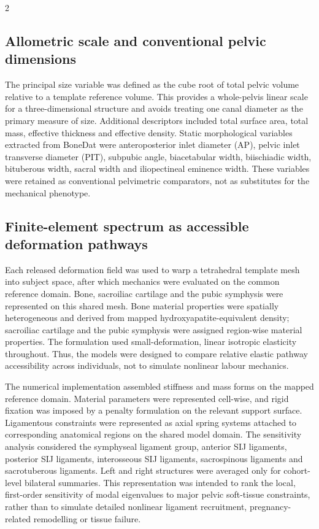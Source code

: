 \documentclass[openacc]{rsproca_new}
\begin{document}
\begin{multicols}{2}
\subsection{Allometric scale and conventional pelvic dimensions}

The principal size variable was defined as the cube root of total pelvic volume relative to a template reference volume. This provides a whole-pelvis linear scale for a three-dimensional structure and avoids treating one canal diameter as the primary measure of size. Additional descriptors included total surface area, total mass, effective thickness and effective density. Static morphological variables extracted from BoneDat were anteroposterior inlet diameter (AP), pelvic inlet transverse diameter (PIT), subpubic angle, biacetabular width, biischiadic width, bituberous width, sacral width and iliopectineal eminence width. These variables were retained as conventional pelvimetric comparators, not as substitutes for the mechanical phenotype.

\subsection{Finite-element spectrum as accessible deformation pathways}

Each released deformation field was used to warp a tetrahedral template mesh into subject space, after which mechanics were evaluated on the common reference domain. Bone, sacroiliac cartilage and the pubic symphysis were represented on this shared mesh. Bone material properties were spatially heterogeneous and derived from mapped hydroxyapatite-equivalent density; sacroiliac cartilage and the pubic symphysis were assigned region-wise material properties. The formulation used small-deformation, linear isotropic elasticity throughout. Thus, the models were designed to compare relative elastic pathway accessibility across individuals, not to simulate nonlinear labour mechanics.

The numerical implementation assembled stiffness and mass forms on the mapped reference domain. Material parameters were represented cell-wise, and rigid fixation was imposed by a penalty formulation on the relevant support surface. Ligamentous constraints were represented as axial spring systems attached to corresponding anatomical regions on the shared model domain. The sensitivity analysis considered the symphyseal ligament group, anterior SIJ ligaments, posterior SIJ ligaments, interosseous SIJ ligaments, sacrospinous ligaments and sacrotuberous ligaments. Left and right structures were averaged only for cohort-level bilateral summaries. This representation was intended to rank the local, first-order sensitivity of modal eigenvalues to major pelvic soft-tissue constraints, rather than to simulate detailed nonlinear ligament recruitment, pregnancy-related remodelling or tissue failure.


\end{multicols}
\end{document}

